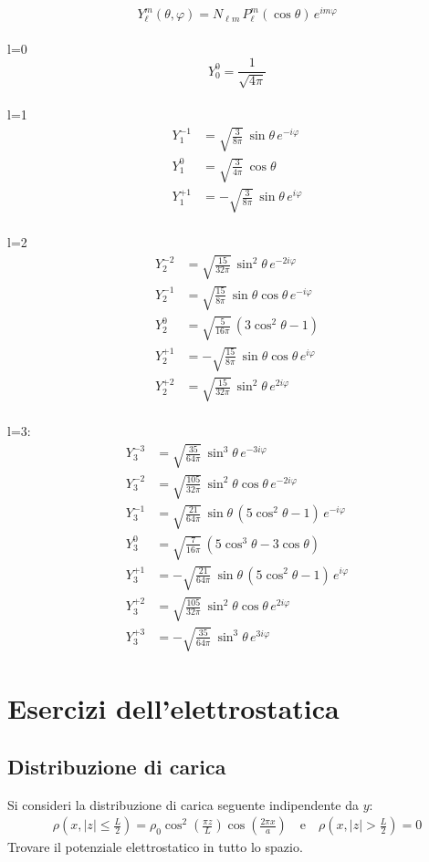 \[
Y_\ell^m(\theta,\varphi) = N_{\ell m}\, P_\ell^m(\cos\theta)\, e^{i m \varphi}
\]
\\l=0
\[
Y_0^0 = \frac{1}{\sqrt{4\pi}}
\]
\\
l=1
\[
\begin{aligned}
Y_1^{-1} &= \sqrt{\frac{3}{8\pi}}\,\sin\theta\, e^{-i\varphi} \\
Y_1^{0}  &= \sqrt{\frac{3}{4\pi}}\,\cos\theta \\
Y_1^{+1} &= -\sqrt{\frac{3}{8\pi}}\,\sin\theta\, e^{i\varphi}
\end{aligned}
\]
\\
l=2
\[
\begin{aligned}
Y_2^{-2} &= \sqrt{\frac{15}{32\pi}}\,\sin^2\theta\, e^{-2i\varphi} \\
Y_2^{-1} &= \sqrt{\frac{15}{8\pi}}\,\sin\theta\cos\theta\, e^{-i\varphi} \\
Y_2^{0}  &= \sqrt{\frac{5}{16\pi}}\,(3\cos^2\theta - 1) \\
Y_2^{+1} &= -\sqrt{\frac{15}{8\pi}}\,\sin\theta\cos\theta\, e^{i\varphi} \\
Y_2^{+2} &= \sqrt{\frac{15}{32\pi}}\,\sin^2\theta\, e^{2i\varphi}
\end{aligned}
\]
\\
l=3:
\[
\begin{aligned}
Y_3^{-3} &= \sqrt{\frac{35}{64\pi}}\,\sin^3\theta\, e^{-3i\varphi} \\
Y_3^{-2} &= \sqrt{\frac{105}{32\pi}}\,\sin^2\theta\cos\theta\, e^{-2i\varphi} \\
Y_3^{-1} &= \sqrt{\frac{21}{64\pi}}\,\sin\theta\,(5\cos^2\theta - 1)\, e^{-i\varphi} \\
Y_3^{0}  &= \sqrt{\frac{7}{16\pi}}\,(5\cos^3\theta - 3\cos\theta) \\
Y_3^{+1} &= -\sqrt{\frac{21}{64\pi}}\,\sin\theta\,(5\cos^2\theta - 1)\, e^{i\varphi} \\
Y_3^{+2} &= \sqrt{\frac{105}{32\pi}}\,\sin^2\theta\cos\theta\, e^{2i\varphi} \\
Y_3^{+3} &= -\sqrt{\frac{35}{64\pi}}\,\sin^3\theta\, e^{3i\varphi}
\end{aligned}
\]

\chapter{Esercizi dell'elettrostatica}


\section{Distribuzione di carica}
Si consideri la distribuzione di carica seguente indipendente da $ y $:
\begin{align}
  \rho(x, |z| \leq \frac{L}{2}) = \rho_0 \cos^2(\frac{\pi z}{L}) \cos (\frac{2\pi x}{a}) \quad \text{e} \quad \rho(x, |z| > \frac{L}{2}) = 0
\end{align}
Trovare il potenziale elettrostatico in tutto lo spazio.

